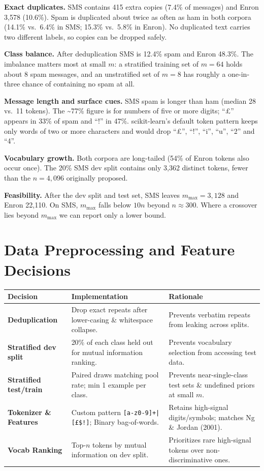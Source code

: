 \documentclass[11pt]{article}
\newcommand{\tokpattern}{\texttt{[a-z0-9]+|[\pounds\$\texteuro!]}}
\begin{document}
\textbf{Exact duplicates.} SMS contains 415 extra copies (7.4\% of messages) and Enron 3,578 (10.6\%). Spam is duplicated about twice as often as ham in both corpora (14.1\% vs.\ 6.4\% in SMS; 15.3\% vs.\ 5.8\% in Enron). No duplicated text carries two different labels, so copies can be dropped safely.

\textbf{Class balance.} After deduplication SMS is 12.4\% spam and Enron 48.3\%. The imbalance matters most at small $m$: a stratified training set of $m = 64$ holds about 8 spam messages, and an unstratified set of $m = 8$ has roughly a one-in-three chance of containing no spam at all.

\textbf{Message length and surface cues.} SMS spam is longer than ham (median 28 vs.\ 11 tokens). The \textasciitilde 77\% figure is for numbers of five or more digits; ``\pounds'' appears in 33\% of spam and ``!'' in 47\%. scikit-learn's default token pattern keeps only words of two or more characters and would drop ``\pounds'', ``!'', ``i'', ``u'', ``2'' and ``4''.

\textbf{Vocabulary growth.} Both corpora are long-tailed (54\% of Enron tokens also occur once). The 20\% SMS dev split contains only 3,362 distinct tokens, fewer than the $n = 4{,}096$ originally proposed.

\textbf{Feasibility.} After the dev split and test set, SMS leaves $m_{\text{max}} = 3{,}128$ and Enron 22,110. On SMS, $m_{\text{max}}$ falls below $10n$ beyond $n \approx 300$. Where a crossover lies beyond $m_{\text{max}}$ we can report only a lower bound.

\section{Data Preprocessing and Feature Decisions}

\begin{center}
\small
\begin{tabularx}{\textwidth}{@{}>{\raggedright\arraybackslash}p{} L L@{}}
\toprule
\textbf{Decision} & \textbf{Implementation} & \textbf{Rationale} \\
\midrule
\textbf{Deduplication} & Drop exact repeats after lower-casing \& whitespace collapse. & Prevents verbatim repeats from leaking across splits. \\
\textbf{Stratified dev split} & 20\% of each class held out for mutual information ranking. & Prevents vocabulary selection from accessing test data. \\
\textbf{Stratified test/train} & Paired draws matching pool rate; min 1 example per class. & Prevents near-single-class test sets \& undefined priors at small $m$. \\
\textbf{Tokenizer \& Features} & Custom pattern \tokpattern; Binary bag-of-words. & Retains high-signal digits/symbols; matches Ng \& Jordan (2001). \\
\textbf{Vocab Ranking} & Top-$n$ tokens by mutual information on dev split. & Prioritizes rare high-signal tokens over non-discriminative ones. \\
\bottomrule
\end{tabularx}
\end{center}
\end{document}
